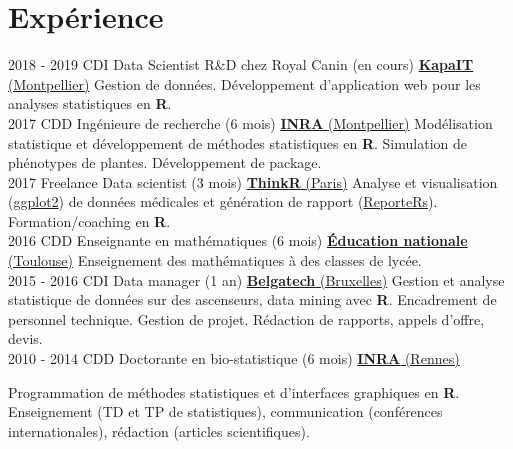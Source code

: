 \documentclass[letterpaper]{twentysecondcv} %
\begin{document}
\makeprofile %


\section{Expérience}

\begin{twenty} %
\twentyitem
    	{2018 - 2019}
		{CDI}
        {Data Scientist R\&D chez Royal Canin \textnormal{(en cours)}}
        {\href{http://www.kapa-it.fr/}{\textbf{KapaIT} (Montpellier)}}
        {}
        {
        Gestion de données. Développement d'application web pour les analyses statistiques en \textbf{R}.
        }
        \\
\twentyitem
    	{2017}
		{CDD}
        {Ingénieure de recherche \textnormal{(6 mois)}}
        {\href{https://www6.montpellier.inra.fr/mistea/}{\textbf{INRA} (Montpellier)}}
        {}
        {
        Modélisation statistique et développement de méthodes statistiques en \textbf{R}. 
        Simulation de phénotypes de plantes. Développement de package.
        }
        \\
	\twentyitem
    	{2017}
		{Freelance}
        {Data scientist \textnormal{(3 mois)}}
        {\href{https://thinkr.fr/}{\textbf{ThinkR} (Paris)}}
        {}
        {
        {
        Analyse et visualisation (\href{https://ggplot2.tidyverse.org/}{ggplot2}) de données médicales et génération de rapport 
        (\href{https://davidgohel.github.io/ReporteRs/}{ReporteRs}). Formation/coaching en \textbf{R}.
        }
        }
    \\   
    \twentyitem
   		{2016}
		{CDD}
        {Enseignante en mathématiques \textnormal{(6 mois)}}
        {\href{http://www.ac-toulouse.fr/}{\textbf{Éducation nationale} (Toulouse)}}
        {}
        {
        Enseignement des mathématiques à des classes de lycée.
        }
     \\
     \twentyitem
   		{2015 - 2016}
		{CDI}
        {Data manager \textnormal{(1 an)}}
        {\href{https://www.belgatech-engineering.com/}{\textbf{Belgatech} (Bruxelles)}}
        {}
        {
        Gestion et analyse statistique de données sur des ascenseurs, data mining avec \textbf{R}. 
        Encadrement de personnel technique. Gestion de projet. Rédaction de rapports, appels d’offre, devis.
    	}
    	    \\   
    \twentyitem
   		{2010 - 2014}
		{CDD}
        {Doctorante en bio-statistique \textnormal{(6 mois)}}
        {\href{https://www6.rennes.inra.fr/pegase}{\textbf{INRA} (Rennes)}}
        {}
        {Programmation de méthodes statistiques et d’interfaces graphiques en \textbf{R}. Enseignement (TD et TP de statistiques), communication (conférences internationales), rédaction (articles scientifiques).
    
}
\end{twenty}
\end{document}
